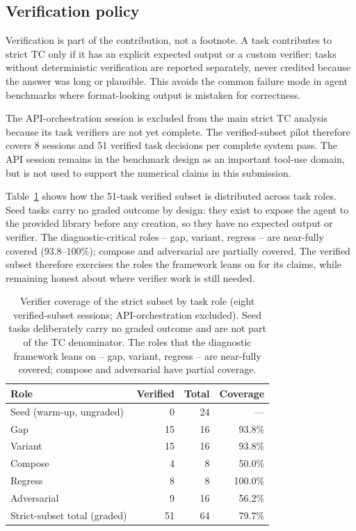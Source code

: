 \documentclass[sigconf,anonymous,review,natbib=false]{acmart}
\begin{document}
\subsection{Verification policy}

Verification is part of the contribution, not a footnote. A task contributes to strict TC only if it has an explicit expected output or a custom verifier; tasks without deterministic verification are reported separately, never credited because the answer was long or plausible. This avoids the common failure mode in agent benchmarks where format-looking output is mistaken for correctness.

The API-orchestration session is excluded from the main strict TC analysis because its task verifiers are not yet complete. The verified-subset pilot therefore covers 8 sessions and 51 verified task decisions per complete system pass. The API session remains in the benchmark design as an important tool-use domain, but is not used to support the numerical claims in this submission.

Table~\ref{tab:role-coverage} shows how the 51-task verified subset is distributed across task roles. Seed tasks carry no graded outcome by design: they exist to expose the agent to the provided library before any creation, so they have no expected output or verifier. The diagnostic-critical roles -- gap, variant, regress -- are near-fully covered ($93.8$--$100\%$); compose and adversarial are partially covered. The verified subset therefore exercises the roles the framework leans on for its claims, while remaining honest about where verifier work is still needed.

\begin{table}[t]
\centering
\small
\caption{Verifier coverage of the strict subset by task role (eight verified-subset sessions; API-orchestration excluded). Seed tasks deliberately carry no graded outcome and are not part of the TC denominator. The roles that the diagnostic framework leans on -- gap, variant, regress -- are near-fully covered; compose and adversarial have partial coverage.}
\label{tab:role-coverage}
\begin{tabular}{lrrr}
\toprule
\textbf{Role} & \textbf{Verified} & \textbf{Total} & \textbf{Coverage} \\
\midrule
Seed (warm-up, ungraded) & 0  & 24 & --- \\
Gap                      & 15 & 16 & 93.8\% \\
Variant                  & 15 & 16 & 93.8\% \\
Compose                  & 4  & 8  & 50.0\% \\
Regress                  & 8  & 8  & 100.0\% \\
Adversarial              & 9  & 16 & 56.2\% \\
\midrule
Strict-subset total (graded) & 51 & 64 & 79.7\% \\
\bottomrule
\end{tabular}
\end{table}
\end{document}

